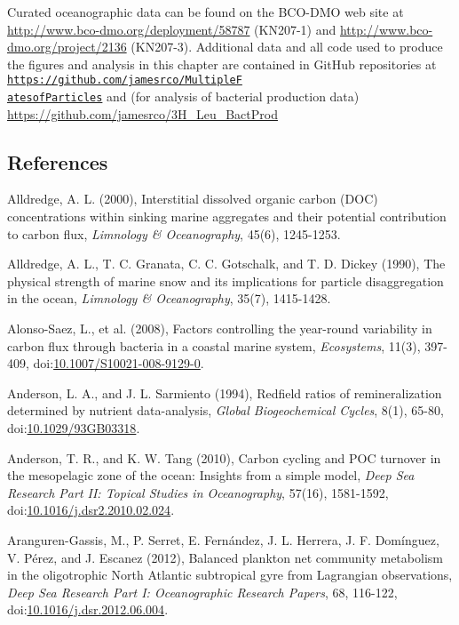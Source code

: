 Curated oceanographic data can be found on the BCO-DMO web site at \url{http://www.bco-dmo.org/deployment/58787} (KN207-1) and \url{http://www.bco-dmo.org/project/2136} (KN207-3). Additional data and all code used to produce the figures and analysis in this chapter are contained in GitHub repositories at \texttt{\href{https://github.com/jamesrco/MultipleFatesofParticles}{https://github.com/jamesrco/MultipleF\\atesofParticles}} and (for analysis of bacterial production data) \url{https://github.com/jamesrco/3H_Leu_BactProd}

\clearpage
\begin{singlespace}
\section*{References}
\addtocounter{section}{1}
{\setlength{\parindent}{0pt}
Alldredge, A. L. (2000), Interstitial dissolved organic carbon (DOC) concentrations within sinking marine aggregates and their potential contribution to carbon flux, \emph{Limnology \& Oceanography}, 45(6), 1245-1253.

{\setlength{\parskip}{10pt}

Alldredge, A. L., T. C. Granata, C. C. Gotschalk, and T. D. Dickey (1990), The physical strength of marine snow and its implications for particle disaggregation in the ocean, \emph{Limnology \& Oceanography}, 35(7), 1415-1428.

Alonso-Saez, L., et al. (2008), Factors controlling the year-round variability in carbon flux through bacteria in a coastal marine system, \emph{Ecosystems}, 11(3), 397-409, doi:\href{http://dx.doi.org/10.1007/S10021-008-9129-0}{10.1007/S10021-008-9129-0}.

Anderson, L. A., and J. L. Sarmiento (1994), Redfield ratios of remineralization determined by nutrient data-analysis, \emph{Global Biogeochemical Cycles}, 8(1), 65-80, doi:\href{http://dx.doi.org/10.1029/93GB03318}{10.1029/93GB03318}.

Anderson, T. R., and K. W. Tang (2010), Carbon cycling and POC turnover in the mesopelagic zone of the ocean: Insights from a simple model, \emph{Deep Sea Research Part II: Topical Studies in Oceanography}, 57(16), 1581-1592, doi:\href{http://dx.doi.org/10.1016/j.dsr2.2010.02.024}{10.1016/j.dsr2.2010.02.024}.

Aranguren-Gassis, M., P. Serret, E. Fern\'{a}ndez, J. L. Herrera, J. F. Dom\'{i}nguez, V. P\'{e}rez, and J. Escanez (2012), Balanced plankton net community metabolism in the oligotrophic North Atlantic subtropical gyre from Lagrangian observations, \emph{Deep Sea Research Part I: Oceanographic Research Papers}, 68, 116-122, doi:\href{http://dx.doi.org/10.1016/j.dsr.2012.06.004}{10.1016/j.dsr.2012.06.004}.

}}
\end{singlespace}
